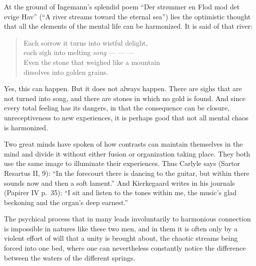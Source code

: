 \documentclass[12pt]{book}
\newcommand{\opage}[1]{\marginnote{\footnotesize\textit{[#1]}}}
\begin{document}
At the ground of Ingemann's splendid poem ``Der strømmer en Flod mod det evige
Hav'' (``A river streams toward the eternal sea'') lies the optimistic thought
that all the elements of the mental life can be harmonized. It is said of that
river:

\begin{quote}
Each sorrow it turns into wistful delight,\\
each sigh into melting \emph{song} --- --- ---\\
Even the stone that weighed like a mountain\\
dissolves into golden grains.
\end{quote}

Yes, this can happen. But it does not always happen. There are sighs that are not
turned into song, and there are stones in which no gold is found. And since every
total feeling has its dangers, in that the consequence can be closure,
unreceptiveness to new experiences, it is perhaps good that not all mental chaos
is harmonized.

Two great minds have spoken of how contrasts can maintain themselves in the mind
and divide it without either fusion or organization taking place. They both use
the same \opage{34}image to illuminate their experiences. Thus Carlyle says
(Sartor Resartus II, 9): ``In the forecourt there is dancing to the guitar, but
within there sounds now and then a soft lament.'' And Kierkegaard writes in his
journals (Papirer IV p.~35): ``I sit and listen to the tones within me, the
music's glad beckoning and the organ's deep earnest.''

The psychical process that in many leads involuntarily to harmonious connection
is impossible in natures like these two men, and in them it is often only by a
violent effort of will that a unity is brought about, the chaotic streams being
forced into one bed, where one can nevertheless constantly notice the difference
between the waters of the different springs.
\end{document}
